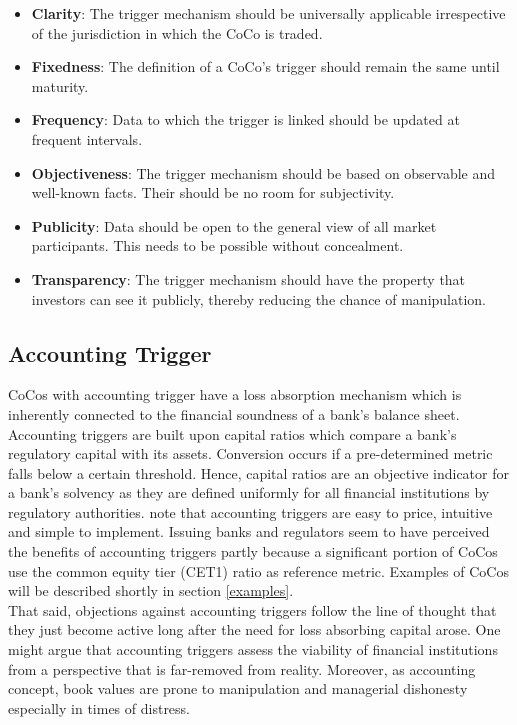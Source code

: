 \begin{itemize}
\renewcommand\labelitemi{--}
\item \textbf{Clarity}:  The trigger mechanism should be universally applicable irrespective of the jurisdiction in which the CoCo is traded.
\item \textbf{Fixedness}: The definition of a CoCo's trigger should remain the same until maturity.
\item \textbf{Frequency}: Data to which the trigger is linked should be updated at frequent intervals.
\item \textbf{Objectiveness}: The trigger mechanism should be based on observable and well-known facts. Their should be no room for subjectivity.
\item \textbf{Publicity}: Data should be open to the general view of all market participants. This needs to be possible without concealment. 
\item \textbf{Transparency}: The trigger mechanism should have the property that investors can see it publicly, thereby reducing the chance of manipulation.
\end{itemize}

\subsection{Accounting Trigger}\label{accountingtrigger}

CoCos with accounting trigger have a loss absorption mechanism which is inherently connected to the financial soundness of a bank's balance sheet. Accounting triggers are built upon capital ratios which compare a bank's regulatory capital with its assets. Conversion occurs if a pre-determined metric falls below a certain threshold. Hence, capital ratios are an objective indicator for a bank's solvency as they are defined uniformly for all financial institutions by regulatory authorities. \citep{de2014handbook} \citet{pazarbasioglu2011contingent} note that accounting triggers are easy to price, intuitive and simple to implement. Issuing banks and regulators seem to have perceived the benefits of accounting triggers partly because a significant portion of CoCos use the common equity tier (CET1) ratio as reference metric. Examples of CoCos will be described shortly in section \ref{examples}.\\

That said, objections against accounting triggers follow the line of thought that they just become active long after the need for loss absorbing capital arose. One might argue that accounting triggers assess the viability of financial institutions from a perspective that is far-removed from reality. \citep{de2011pricing} Moreover, as accounting concept, book values are prone to manipulation and managerial dishonesty especially in times of distress. \citep{mcdonald2013contingent}\\ 

